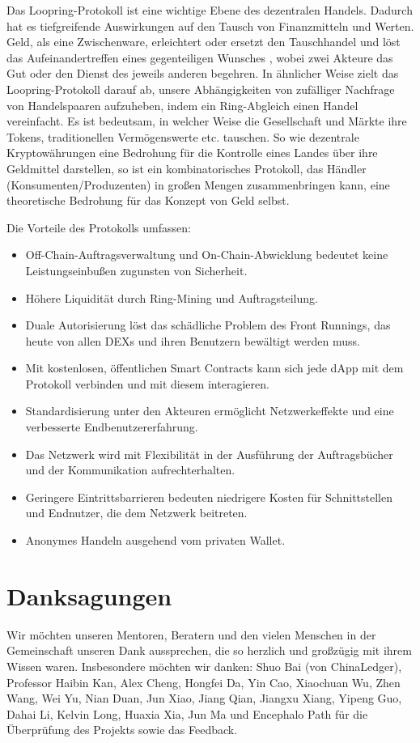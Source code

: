 \documentclass[UTF8,nofonts]{article}
\begin{document}
\begin{multicols}{2}
Das Loopring-Protokoll ist eine wichtige Ebene des dezentralen Handels. Dadurch hat es tiefgreifende Auswirkungen auf den Tausch von Finanzmitteln und Werten. Geld, als eine Zwischenware, erleichtert oder ersetzt den Tauschhandel und löst das Aufeinandertreffen eines gegenteiligen Wunsches \cite{unenumerated2006}, wobei zwei Akteure das Gut oder den Dienst des jeweils anderen begehren. In ähnlicher Weise zielt das Loopring-Protokoll darauf ab, unsere Abhängigkeiten von zufälliger Nachfrage von Handelspaaren aufzuheben, indem ein Ring-Abgleich einen Handel vereinfacht. Es ist bedeutsam, in welcher Weise die Gesellschaft und Märkte ihre Tokens, traditionellen Vermögenswerte etc. tauschen. So wie dezentrale Kryptowährungen eine Bedrohung für die Kontrolle eines Landes über ihre Geldmittel darstellen, so ist ein kombinatorisches Protokoll, das Händler (Konsumenten/Produzenten) in großen Mengen zusammenbringen kann, eine theoretische Bedrohung für das Konzept von Geld selbst.

Die Vorteile des Protokolls umfassen:

\begin{itemize}
	\item Off-Chain-Auftragsverwaltung und On-Chain-Abwicklung bedeutet keine Leistungseinbußen zugunsten von Sicherheit.
	\item Höhere Liquidität durch Ring-Mining und Auftragsteilung.
	\item Duale Autorisierung löst das schädliche Problem des Front Runnings, das heute von allen DEXs und ihren Benutzern bewältigt werden muss.
	\item Mit kostenlosen, öffentlichen Smart Contracts kann sich jede dApp mit dem Protokoll verbinden und mit diesem interagieren.
	\item Standardisierung unter den Akteuren ermöglicht Netzwerkeffekte und eine verbesserte Endbenutzererfahrung.
	\item Das Netzwerk wird mit Flexibilität in der Ausführung der Auftragsbücher und der Kommunikation aufrechterhalten.
	\item Geringere Eintrittsbarrieren bedeuten niedrigere Kosten für Schnittstellen und Endnutzer, die dem Netzwerk beitreten.
	\item Anonymes Handeln ausgehend vom privaten Wallet.
\end{itemize}

\section{Danksagungen}
Wir möchten unseren Mentoren, Beratern und den vielen Menschen in der Gemeinschaft unseren Dank aussprechen, die so herzlich und großzügig mit ihrem Wissen waren. Insbesondere möchten wir danken: Shuo Bai (von ChinaLedger), Professor Haibin Kan, Alex Cheng, Hongfei Da, Yin Cao, Xiaochuan Wu, Zhen Wang, Wei Yu, Nian Duan, Jun Xiao, Jiang Qian, Jiangxu Xiang, Yipeng Guo, Dahai Li, Kelvin Long, Huaxia Xia, Jun Ma und Encephalo Path für die Überprüfung des Projekts sowie das Feedback.






\end{multicols}
\end{document}
